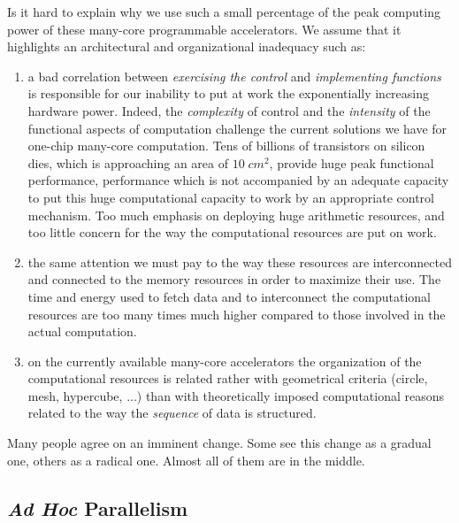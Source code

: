 

Is it hard to explain why we use such a small percentage of the peak computing power of these many-core programmable accelerators. We assume that it highlights an architectural and organizational inadequacy such as:
\begin{enumerate}
    \item  a bad correlation between {\em exercising the control} and {\em implementing functions} is responsible for our inability to put at work the exponentially increasing hardware power. Indeed, the {\em complexity} of control and the {\em intensity} of the functional aspects of computation challenge the current solutions we have for one-chip many-core computation. Tens of billions of transistors on silicon dies, which is approaching an area of $10 \; cm^2$, provide huge peak functional performance, performance which is not accompanied by an adequate capacity to put this huge computational capacity to work by an appropriate control mechanism. Too much emphasis on deploying huge arithmetic resources, and too little concern for the way the computational resources are put on work.

    \item the same attention we must pay to the way these resources are interconnected and connected to the memory resources in order to maximize their use. The time and energy used to fetch data and to interconnect the computational resources are too many times much higher compared to those involved in the actual computation.

    \item  on the currently available many-core accelerators the organization of the computational resources is related rather with geometrical criteria (circle, mesh, hypercube, ...) than with theoretically imposed computational reasons related to the way the {\em sequence} of data is structured.
\end{enumerate}
Many people agree on an imminent change. Some see this change as a gradual one, others as a radical one. Almost all of them are in the middle.

\subsection{{\em Ad Hoc} Parallelism}

